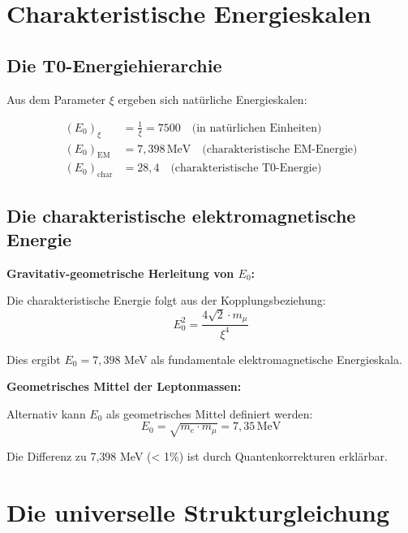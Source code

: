 	\section{Charakteristische Energieskalen}
	
	\subsection{Die T0-Energiehierarchie}
	
	Aus dem Parameter $\xi$ ergeben sich natürliche Energieskalen:
	
	\begin{align}
		(E_0)_{\xi} &= \frac{1}{\xi} = 7500 \quad \text{(in natürlichen Einheiten)} \\
		(E_0)_{\text{EM}} &= 7{,}398\,\mathrm{MeV} \quad \text{(charakteristische EM-Energie)} \\
		(E_0)_{\text{char}} &= 28{,}4 \quad \text{(charakteristische T0-Energie)}
	\end{align}
	
	\subsection{Die charakteristische elektromagnetische Energie}
	
	\begin{keyresult}
		\textbf{Gravitativ-geometrische Herleitung von $E_0$:}
		
		Die charakteristische Energie folgt aus der Kopplungsbeziehung:
		\begin{equation}
			E_0^2 = \frac{4\sqrt{2} \cdot m_\mu}{\xi^4}
		\end{equation}
		
		Dies ergibt $E_0 = 7{,}398$ MeV als fundamentale elektromagnetische Energieskala.
	\end{keyresult}
	
	\begin{alternative}
		\textbf{Geometrisches Mittel der Leptonmassen:}
		
		Alternativ kann $E_0$ als geometrisches Mittel definiert werden:
		\begin{equation}
			E_0 = \sqrt{m_e \cdot m_\mu} = 7{,}35\,\mathrm{MeV}
		\end{equation}
		
		Die Differenz zu 7{,}398 MeV (< 1\%) ist durch Quantenkorrekturen erklärbar.
	\end{alternative}
	
	\section{Die universelle Strukturgleichung}
	
